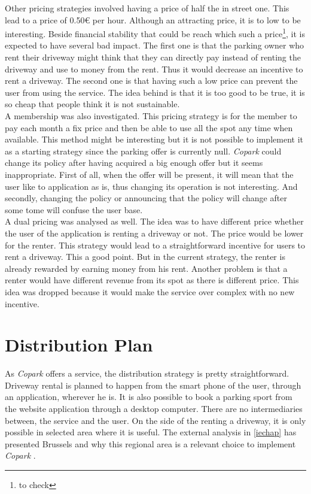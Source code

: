 \documentclass[12pt,a4paper,oneside]{book}
\newcommand{\bp}{\textit{Copark }}
\begin{document}
Other pricing strategies involved having a price of half the in street one. This lead to a price of 0.50\euro{} per hour. Although an attracting price, it is to low to be interesting. Beside financial stability that could be reach which such a price\footnote{to check}, it is expected to have several bad impact. The first one is that the parking owner who rent their driveway might think that they can directly pay instead of renting the driveway and use to money from the rent. Thus it would decrease an incentive to rent a driveway. The second one is that having such a low price can prevent the user from using the service. The idea behind is that it is too good to be true, it is so cheap that people think it is not sustainable.\\

A membership was also investigated. This pricing strategy is for the member to pay each month a fix price and then be able to use all the spot any time when available. This method might be interesting but it is not possible to implement it as a starting strategy since the parking offer is currently null. \bp could change its policy after having acquired a big enough offer but it seems inappropriate. First of all, when the offer will be present, it will mean that the user like to application as is, thus changing its operation is not interesting. And secondly, changing the policy or announcing that the policy will change after some tome will confuse the user base.\\

A dual pricing was analysed as well. The idea was to have different price whether the user of the application is renting a driveway or not. The price would be lower for the renter. This strategy would lead to a straightforward incentive for users to rent a driveway. This a good point. But in the current strategy, the renter is already rewarded by earning money from his rent. Another problem is that a renter would have different revenue from its spot as there is different price. This idea was dropped because it would make the service over complex with no new incentive.

\section{Distribution Plan}

As \bp offers a service, the distribution strategy is pretty straightforward. Driveway rental is planned to happen from the smart phone of the user, through an application, wherever he is. It is also possible to book a parking sport from the website application through a desktop computer. There are no intermediaries between, the service and the user. On the side of the renting a driveway, it is only possible in selected area where it is useful. The external analysis in \autoref{iechap} has presented Brussels and why this regional area is a relevant choice to implement \bp.
\end{document}
